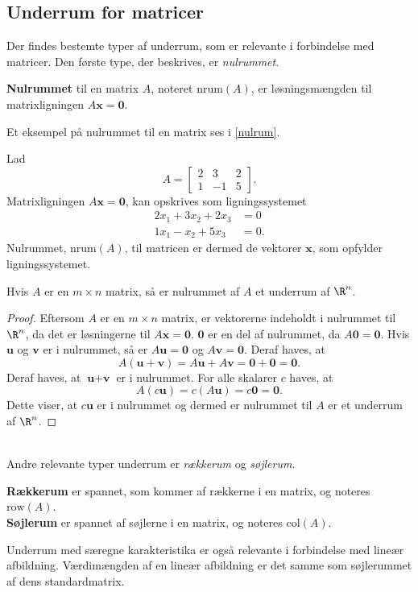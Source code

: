 \subsection{Underrum for matricer}
Der findes bestemte typer af underrum, som er relevante i forbindelse med matricer. Den første type, der beskrives, er \textit{nulrummet}.
%
\begin{defn}{}{}
\textbf{Nulrummet} til en matrix $A$, noteret $\text{nrum}(A)$, er løsningsmængden til matrixligningen $A\textbf{x}=\textbf{0}$. 
\end{defn}
%
\noindent
Et eksempel på nulrummet til en matrix ses i \ref{nulrum}.\\
%
\begin{eks}
\label{nulrum}
Lad 
$$A=\begin{bmatrix}
2 & 3 & 2\\
1 & -1 & 5
\end{bmatrix}.$$
Matrixligningen $A\textbf{x}=\textbf{0}$,
kan opskrives som ligningssystemet
\begin{align*}
2x_1+3x_2+2x_3&=0\\
1x_1-x_2+5x_3&=0.
\end{align*}
Nulrummet, $\text{nrum}(A)$, til matricen er dermed de vektorer $\textbf{x}$, som opfylder ligningssystemet.
\end{eks} 
%
\begin{thm}{}{}
Hvis $A$ er en $m\times n$ matrix, så er nulrummet af $A$ et underrum af $\R^n$.
\end{thm}
%
\begin{proof}
Eftersom $A$ er en $m\times n$ matrix, er vektorerne indeholdt i nulrummet til $\R^n$, da det er løsningerne til $A\textbf{x}=\textbf{0}$.
$\textbf{0}$ er en del af nulrummet, da $A\textbf{0}=\textbf{0}$. 
Hvis $\textbf{u}$ og $\textbf{v}$ er i nulrummet, så er $A\textbf{u}=\textbf{0}$ og $A\textbf{v}=\textbf{0}$. 
Deraf haves, at
%
$$A(\textbf{u}+\textbf{v})=A\textbf{u}+A\textbf{v}=\textbf{0}+\textbf{0}=\textbf{0}.$$
%
Deraf haves, at $\textbf{u}+\textbf{v}$ er i nulrummet. 
For alle skalarer $c$ haves, at
$$A(c\textbf{u})=c(A\textbf{u})=c\textbf{0}=\textbf{0}.$$
Dette viser, at $c\textbf{u}$ er i nulrummet og dermed er nulrummet til $A$ er et underrum af $\R^n$.
\end{proof}
\\
\noindent
Andre relevante typer underrum er \textit{rækkerum} og \textit{søjlerum}.
%
\begin{defn}{}{}
\textbf{Rækkerum} er spannet, som kommer af rækkerne i en matrix, og noteres $\text{row}(A)$.
\\
\textbf{Søjlerum} er spannet af søjlerne i en matrix, og noteres $\text{col}(A)$.
\end{defn}
\noindent
Underrum med særegne karakteristika er også relevante i forbindelse med lineær afbildning.
Værdimængden af en lineær afbildning er det samme som søjlerummet af dens standardmatrix.
%
